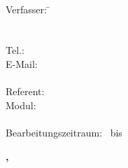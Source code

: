 \begin{titlepage}
    
    \begin{center}
        \huge{\haupttitel}\\
         \vfill
        \large{\untertitel}
    \end{center}
    
    \vfill
    
    \begin{tabbing}
    Verfasser:  \=\hspace*{2.5cm} \autorenschaft\\
                \>\hspace*{2.5cm} \adresse\\
                \>\hspace*{2.5cm} \plz\ \ort\\
                \>\hspace*{2.5cm} Tel.: \telefon\\
                \>\hspace*{2.5cm} E-Mail: \email\\
                \\
    Referent:   \>\hspace*{2.5cm} \betreuung\\
    Modul:      \>\hspace*{2.5cm} \modul\\
                \\
    Bearbeitungszeitraum: \>\hspace*{2.5cm} \datumVon\ bis \datumBis
    \end{tabbing}
    
    \vfill
    
    \begin{center} 
        \textbf{\ort, \datumBisMonatJahr}
    \end{center}

\end{titlepage}